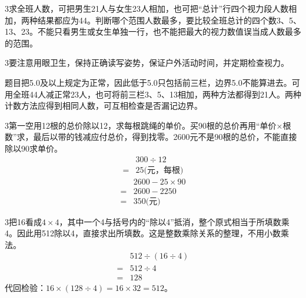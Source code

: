 \documentclass[multi=snippet,border={5bp 20bp 5bp 5bp}]{standalone}
\newenvironment{snippet}[3]{\begin{minipage}{#1bp}\color{answerred}\fontsize{#2}{#3}\selectfont\raggedright}{\end{minipage}}
\begin{document}
\begin{snippet}{505}{11.5}{14}\begin{multicols}{3}\raggedcolumns 求全班人数，可把男生21人与女生23人相加，也可把“总计”行四个视力段人数相加，两种结果都应为44。判断哪个范围人数最多，要比较全班总计的四个数3、5、13、23。不能只看男生或女生单独一行，也不能把最大的视力数值误当成人数最多的范围。\end{multicols}\end{snippet}
\begin{snippet}{505}{11.5}{14}\begin{multicols}{3}\raggedcolumns 要注意用眼卫生，保持正确读写姿势，保证户外活动时间，并定期检查视力。\par 题目把5.0及以上规定为正常，因此低于5.0只包括前三栏，边界5.0不能算进去。可用全班44人减正常23人，也可将前三栏3、5、13相加，两种方法都得到21人。两种计数方法应得到相同人数，可互相检查是否漏记边界。\end{multicols}\end{snippet}
\begin{snippet}{505}{11.5}{14}\begin{multicols}{3}\raggedcolumns 第一空用12根的总价除以12，求每根跳绳的单价。买90根的总价再用“单价×根数”求，最后以带的钱减应付总价，得到找零。2600元不是90根的总价，不能直接除以90求单价。\[\begin{aligned}&300\div12\\={}&25\text{(元，每根)}\end{aligned}\]\[\begin{aligned}&2600-25\times90\\={}&2600-2250\\={}&350\text{(元)}\end{aligned}\]\end{multicols}\end{snippet}
\begin{snippet}{505}{11.5}{14}\begin{multicols}{3}\raggedcolumns 把16看成\(4\times4\)\allowbreak ，其中一个4与括号内的“除以4”抵消，整个原式相当于所填数乘4。因此用512除以4，直接求出所填数。这是整数乘除关系的整理，不用小数乘法。\[\begin{aligned}&512\div(16\div4)\\={}&512\div4\\={}&128\end{aligned}\]代回检验：\(16\times(128\div4)=16\times32=512\)\allowbreak 。\end{multicols}\end{snippet}
\end{document}
